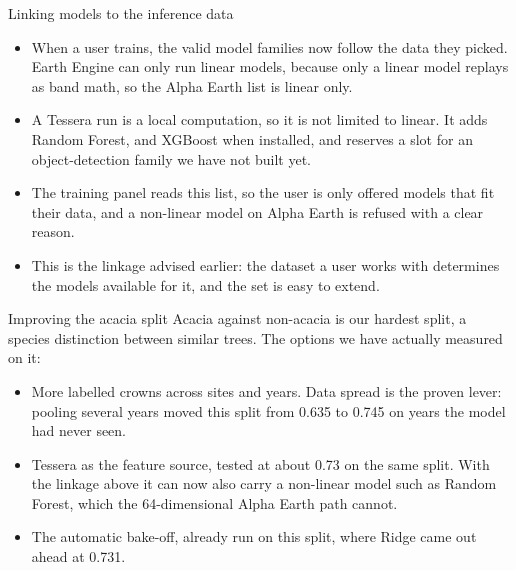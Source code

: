 \documentclass[aspectratio=169]{beamer}
\begin{document}
\begin{frame}{Linking models to the inference data}
\begin{itemize}
  \item When a user trains, the valid model families now follow the data they picked. Earth Engine
  can only run linear models, because only a linear model replays as band math, so the Alpha Earth
  list is linear only.
  \item A Tessera run is a local computation, so it is not limited to linear. It adds Random Forest,
  and XGBoost when installed, and reserves a slot for an object-detection family we have not built
  yet.
  \item The training panel reads this list, so the user is only offered models that fit their data,
  and a non-linear model on Alpha Earth is refused with a clear reason.
  \item This is the linkage advised earlier: the dataset a user works with determines the models
  available for it, and the set is easy to extend.
\end{itemize}
\end{frame}

\begin{frame}{Improving the acacia split}
Acacia against non-acacia is our hardest split, a species distinction between similar trees. The
options we have actually measured on it:
\begin{itemize}
  \item More labelled crowns across sites and years. Data spread is the proven lever: pooling several
  years moved this split from 0.635 to 0.745 on years the model had never seen.
  \item Tessera as the feature source, tested at about 0.73 on the same split. With the linkage
  above it can now also carry a non-linear model such as Random Forest, which the 64-dimensional
  Alpha Earth path cannot.
  \item The automatic bake-off, already run on this split, where Ridge came out ahead at 0.731.
\end{itemize}
\end{frame}
\end{document}
